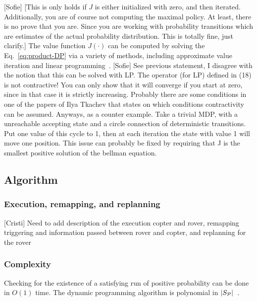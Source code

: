 \documentclass[conference]{IEEEtran}
\newcommand{\cristi}[1]{{\color{orange} [Cristi] #1}}
\newcommand{\sofie}[1]{{\color{purple} [Sofie] #1}}
\begin{document}
\sofie{[This is only holds if $J$ is either initialized with zero, and then iterated. Additionally, you are of course not computing the maximal policy. At least, there is no prove that you are. Since you are working with probability transitions which are estimates of the actual probability distribution. This is totally fine, just clarify.]}
The value function $J(\cdot)$ can be computed by solving the Eq.~\ref{eq:product-DP} via a variety of methods, including approximate value iteration and linear programming~\cite{Bertsekas2012}.
\sofie{See previous statement, I disagree with the notion that this can be solved with LP. The operator (for LP) defined in (18) is not contractive!  You can only show that it will converge if you start at zero, since in that case it is strictly increasing. Probably there are some conditions in one of the papers of Ilya Tkachev that states on which conditions contractivity can be assumed. Anyways, as a counter example. Take a trivial MDP, with a unreachable accepting state and a circle connection of deterministic transitions. Put one value of this cycle to 1, then at each iteration the state with value 1 will move one position. This issue can probably be fixed by requiring that J is the smallest positive solution of the bellman equation.}



\subsection{Algorithm}%

\subsubsection{Execution, remapping, and replanning} \label{replanning}

\cristi{Need to add description of the execution copter and rover,
remapping triggering and information passed between rover and copter, and replanning
for the rover}

\subsubsection{Complexity}\label{complexity}
Checking for the existence of a satisfying run of positive probability
can be done in $O(1)$ time.
The dynamic programming algorithm is polynomial in
$\left| {S_{\mathcal{P}}} \right|$~\cite{papadimitriou1987}.
\end{document}

